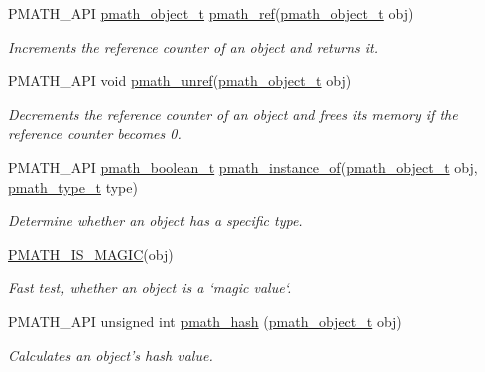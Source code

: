 \begin{CompactItemize}
\item 
PMATH\_\-API \hyperlink{classpmath__object__t}{pmath\_\-object\_\-t} \hyperlink{classpmath__object__t_1a4ec016d4b7d5b34257b1af54dfa035}{pmath\_\-ref}(\hyperlink{classpmath__object__t}{pmath\_\-object\_\-t} obj)
\begin{CompactList}\small\item\em Increments the reference counter of an object and returns it. \item\end{CompactList}\item 
PMATH\_\-API void \hyperlink{classpmath__object__t_17295f71102245f7f74b7fd89cfa7584}{pmath\_\-unref}(\hyperlink{classpmath__object__t}{pmath\_\-object\_\-t} obj)
\begin{CompactList}\small\item\em Decrements the reference counter of an object and frees its memory if the reference counter becomes 0. \item\end{CompactList}\item 
PMATH\_\-API \hyperlink{group__general__types_g8e45b3972d0a6a89b2b45eb9eae6d8f7}{pmath\_\-boolean\_\-t} \hyperlink{classpmath__object__t_5ac4a06bc219697d09cb1f8c5d87acd9}{pmath\_\-instance\_\-of}(\hyperlink{classpmath__object__t}{pmath\_\-object\_\-t} obj, \hyperlink{group__objects_ge2646df76dcb0113715322b13a1f36f0}{pmath\_\-type\_\-t} type)
\begin{CompactList}\small\item\em Determine whether an object has a specific type. \item\end{CompactList}\item 
\hyperlink{group__objects_gfa4048bca71f5022d1fb979a5b930a11}{PMATH\_\-IS\_\-MAGIC}(obj)
\begin{CompactList}\small\item\em Fast test, whether an object is a `magic value`. \item\end{CompactList}\item 
PMATH\_\-API unsigned int \hyperlink{group__objects_g472762687d2a2b772beb00c7da677543}{pmath\_\-hash} (\hyperlink{classpmath__object__t}{pmath\_\-object\_\-t} obj)
\begin{CompactList}\small\item\em Calculates an object's hash value. \item\end{CompactList}\item 

\end{CompactItemize}
